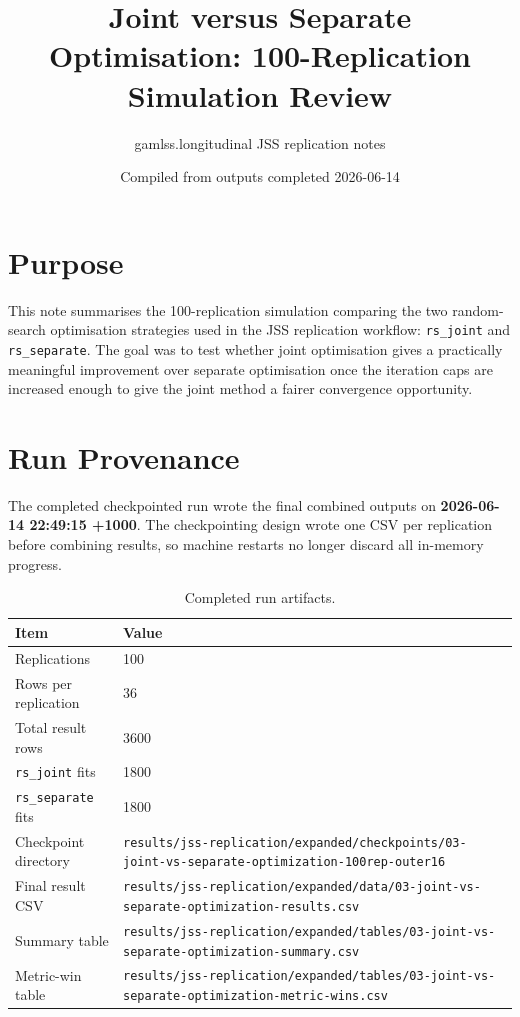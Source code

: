 \documentclass[11pt]{article}
\title{Joint versus Separate Optimisation: 100-Replication Simulation Review}
\author{gamlss.longitudinal JSS replication notes}
\date{Compiled from outputs completed 2026-06-14}
\begin{document}
\maketitle

\section{Purpose}

This note summarises the 100-replication simulation comparing the two
random-search optimisation strategies used in the JSS replication workflow:
\texttt{rs\_joint} and \texttt{rs\_separate}.  The goal was to test whether
joint optimisation gives a practically meaningful improvement over separate
optimisation once the iteration caps are increased enough to give the joint
method a fairer convergence opportunity.

\section{Run Provenance}

The completed checkpointed run wrote the final combined outputs on
\textbf{2026-06-14 22:49:15 +1000}.  The checkpointing design wrote one CSV
per replication before combining results, so machine restarts no longer discard
all in-memory progress.

\begin{table}[ht]
\centering
\caption{Completed run artifacts.}
\begin{tabular}{ll}
\toprule
Item & Value \\
\midrule
Replications & 100 \\
Rows per replication & 36 \\
Total result rows & 3600 \\
\texttt{rs\_joint} fits & 1800 \\
\texttt{rs\_separate} fits & 1800 \\
Checkpoint directory &
\texttt{results/jss-replication/expanded/checkpoints/03-joint-vs-separate-optimization-100rep-outer16} \\
Final result CSV &
\texttt{results/jss-replication/expanded/data/03-joint-vs-separate-optimization-results.csv} \\
Summary table &
\texttt{results/jss-replication/expanded/tables/03-joint-vs-separate-optimization-summary.csv} \\
Metric-win table &
\texttt{results/jss-replication/expanded/tables/03-joint-vs-separate-optimization-metric-wins.csv} \\
\bottomrule
\end{tabular}
\end{table}
\end{document}
